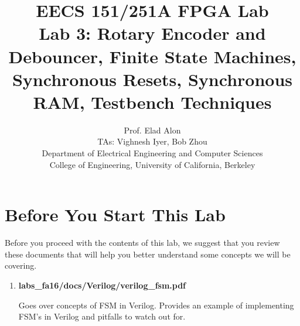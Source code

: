 \documentclass[11pt]{article}
\begin{document}
\title{EECS 151/251A FPGA Lab\\
Lab 3: Rotary Encoder and Debouncer, Finite State Machines, Synchronous Resets, Synchronous RAM, Testbench Techniques}

\author{Prof. Elad Alon \\
TAs: Vighnesh Iyer, Bob Zhou \\Department of Electrical Engineering and Computer Sciences\\
College of Engineering, University of California, Berkeley}
\date{}
\maketitle

\tableofcontents

\section{Before You Start This Lab}

Before you proceed with the contents of this lab, we suggest that you review these documents that will help you better understand some concepts we will be covering.

\begin{enumerate}
	\item \textbf{labs\_fa16/docs/Verilog/verilog\_fsm.pdf}
	
	Goes over concepts of FSM in Verilog. Provides an example of implementing FSM's in Verilog and pitfalls to watch out for.
	
	
	

\end{enumerate}
\end{document}
